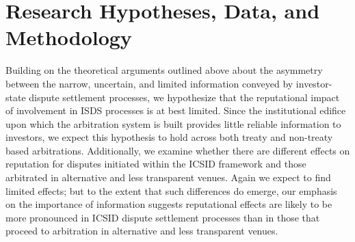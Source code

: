 \documentclass[12pt,onesided]{amsart}
\begin{document}

\section*{Research Hypotheses, Data, and Methodology}

Building on the theoretical arguments outlined above about the asymmetry between the narrow, uncertain, and limited information conveyed by investor-state dispute settlement processes, we hypothesize that the reputational impact of involvement in ISDS processes is at best limited. Since the institutional edifice upon which the arbitration system is built provides little reliable information to investors, we expect this hypothesis to hold across both treaty and non-treaty based arbitrations. Additionally, we examine whether there are different effects on reputation for disputes initiated within the ICSID framework and those arbitrated in alternative and less transparent venues. Again we expect to find limited effects; but to the extent that such differences do emerge, our emphasis on the importance of information suggests reputational effects are likely to be more pronounced in ICSID dispute settlement processes than in those that proceed to arbitration in alternative and less transparent venues.
\end{document}
